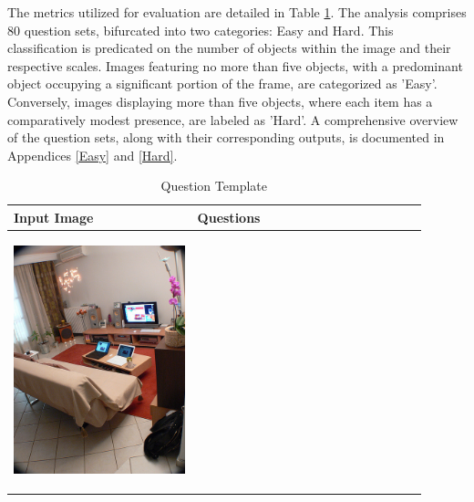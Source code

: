 \documentclass[twocolumn,11pt]{report}
\begin{document}
The metrics utilized for evaluation are detailed in Table \ref{tab:question_template}. The analysis comprises 80 question sets, bifurcated into two categories: Easy and Hard. This classification is predicated on the number of objects within the image and their respective scales. Images featuring no more than five objects, with a predominant object occupying a significant portion of the frame, are categorized as 'Easy'. Conversely, images displaying more than five objects, where each item has a comparatively modest presence, are labeled as 'Hard'. A comprehensive overview of the question sets, along with their corresponding outputs, is documented in Appendices \ref{Easy} and \ref{Hard}.
\begin{table}[ht]
    \centering
    \caption{Question Template}
    \label{tab:question_template}
    \begin{tabular}{|p{0.4\linewidth}|p{0.5\linewidth}|}
        \hline
        \textbf{Input Image} &\textbf{Questions}\\
        \hline
        \begin{center} \includegraphics[width=\linewidth]{../image set/hard/000000104739.jpg} \end{center}

\end{tabular}
\end{table}
\end{document}
